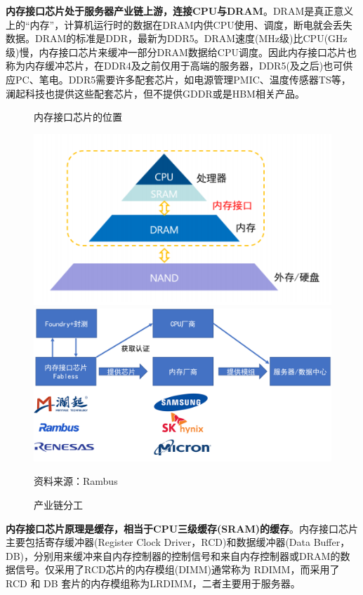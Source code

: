 \documentclass[a4paper,12pt]{ctexart}
\begin{document}
\textbf{内存接口芯片处于服务器产业链上游，连接CPU与DRAM}。DRAM是真正意义上的“内存”，计算机运行时的数据在DRAM内供CPU使用、调度，断电就会丢失数据。DRAM的标准是DDR，最新为DDR5。DRAM速度(MHz级)比CPU(GHz级)慢，内存接口芯片来缓冲一部分DRAM数据给CPU调度。因此内存接口芯片也称为内存缓冲芯片，在DDR4及之前仅用于高端的服务器，DDR5(及之后)也可供应PC、笔电。DDR5需要许多配套芯片，如电源管理PMIC、温度传感器TS等，澜起科技也提供这些配套芯片，但不提供GDDR或是HBM相关产品。
\begin{figure}[H]
    \begin{minipage}{0.48\linewidth}
        \centering
        \caption{内存接口芯片的位置}
        \includegraphics[width=0.8\linewidth]{img/illustration.png}
    \end{minipage}
    \begin{minipage}{0.48\linewidth}
        \centering
        \caption{产业链分工}
        \includegraphics[width=0.8\linewidth]{img/chain.png}
    \end{minipage}\par
    \footnotesize{资料来源：Rambus}
\end{figure}
\textbf{内存接口芯片原理是缓存，相当于CPU三级缓存(SRAM)的缓存}。内存接口芯片主要包括寄存缓冲器(Register Clock Driver，RCD)和数据缓冲器(Data Buffer，DB)，分别用来缓冲来自内存控制器的控制信号和来自内存控制器或DRAM的数据信号。仅采用了RCD芯片的内存模组(DIMM)通常称为 RDIMM，而采用了 RCD 和 DB 套片的内存模组称为LRDIMM，二者主要用于服务器。
\end{document}
